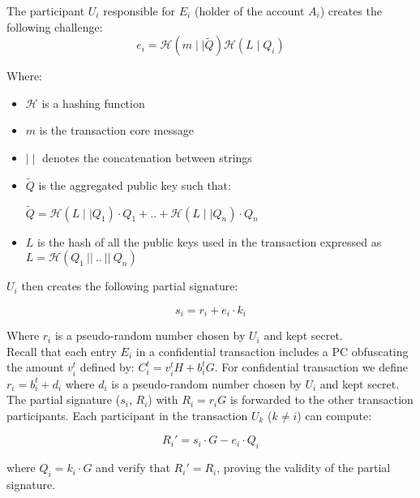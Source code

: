 The participant $U_i$ responsible for $E_i$ (holder of the account $A_i$) creates the following challenge:
\begin{equation} 
e_i = \mathcal{H}(m \mid\mid \tilde{Q})\mathcal{H}(L \mid Q_i)
\end{equation} 

Where:

\begin{itemize}
	\item$\mathcal{H}$ is a hashing function
	\item$m$ is the transaction core message 
	\item$\mid\mid$ denotes the concatenation between strings
	\item$\tilde{Q}$ is the aggregated public key such that:
\begin{center}
$\tilde{Q}=\mathcal{H}(L \mid\mid Q_1)\cdot Q_1 + .. + \mathcal{H}(L \mid\mid Q_n)\cdot Q_n$
\end{center}
	\item$L$ is the hash of all the public keys used in the transaction expressed as $L=\mathcal{H}(Q_1~||~..~||~Q_n)$
\end{itemize}

$U_i$ then creates the following partial signature:

\begin{equation} 
s_{i} = r_i + e_i\cdot k_i
\end{equation}

Where $r_i$ is a pseudo-random number chosen by $U_i$ and kept secret.\\

 Recall that each entry $E_i$ in a confidential transaction includes a PC obfuscating the amount $v_i^{t}$ defined by: $C_i^{t} = v_i ^{t} H + b_i^{t} G$. For confidential transaction we define $r_i = b_i^t + d_i$ where $d_i$ is a pseudo-random number chosen by $U_i$ and kept secret.\\

The partial signature ($s_i$, $R_i$) with $R_i = r_iG$ is forwarded to the other transaction participants. Each participant in the transaction $U_k$ ($k\neq i$) can compute:

\begin{equation} 
R_i' = s_{i}\cdot G - e_i\cdot Q_i
\end{equation}

where $Q_i = k_i\cdot G$ and verify that $R_i' = R_i$, proving the validity of the partial signature. \\

